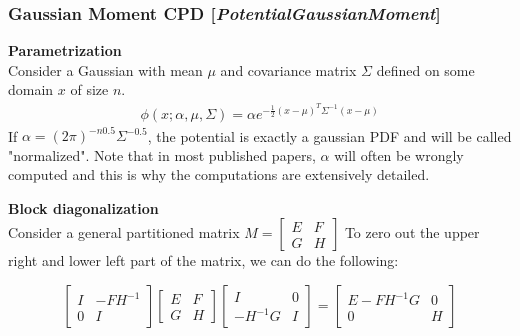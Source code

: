 \documentclass[11pt]{article}
\newcommand{\nllref}[1]{[\small{\textit{#1}}]}
\newcommand{\subsubsubsection}[1]{\noindent\textbf{#1}\\}
\begin{document}
\subsubsection{Gaussian Moment CPD \nllref{PotentialGaussianMoment}}
\subsubsubsection{Parametrization}
Consider a Gaussian with mean $\mu$ and covariance matrix $\Sigma$ defined on some domain $x$ of size $n$.
\begin{align*}
\phi(x; \alpha, \mu, \Sigma) = \alpha  e^{-\frac{1}{2}(x-\mu)^T\Sigma^{-1}(x-\mu)}
\end{align*}
If $\alpha = (2\pi)^{-n0.5} \Sigma^{-0.5}$, the potential is exactly a gaussian PDF and will be called "normalized". Note that in most published papers, $\alpha$ will often be wrongly computed and this is why the computations are extensively detailed.

\subsubsubsection{Block diagonalization}
Consider a general partitioned matrix $M= \left[ \begin{array}{cc} E & F \\ G & H \end{array} \right]$ To zero out the upper right and lower left part of the matrix, we can do the following:

$$
\left[ \begin{array}{cc} I & -FH^{-1} \\ 0 & I \end{array} \right]
\left[ \begin{array}{cc} E & F \\ G & H \end{array} \right]
\left[ \begin{array}{cc} I & 0 \\ -H^{-1}G & I \end{array} \right]
=
\left[ \begin{array}{cc} E-FH^{-1}G & 0 \\ 0 & H \end{array} \right]
$$
\end{document}
